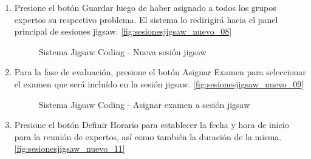 \begin{enumerate}
\begin{figure}
	\end{figure}
	\item Presione el botón Guardar luego de haber asignado a todos los grupos expertos su respectivo problema. El sistema lo redirigirá hacia el panel principal de sesiones jigsaw. \autoref{fig:sesionesjigsaw_nuevo_08}
	\begin{figure}
		\centering
		\caption{Sistema Jigsaw Coding - Nueva sesión jigsaw}
		\label{fig:sesionesjigsaw_nuevo_08}
	\end{figure}
	\item Para la fase de evaluación, presione el botón Asignar Examen para seleccionar el examen que será incluído en la sesión jigsaw. \autoref{fig:sesionesjigsaw_nuevo_09}
	\begin{figure}
		\centering
		\caption{Sistema Jigsaw Coding - Asignar examen a sesión jigsaw}
		\label{fig:sesionesjigsaw_nuevo_09}
	\end{figure}
	\item Presione el botón Definir Horario para establecer la fecha y hora de inicio para la reunión de expertos, así como también la duración de la misma. \autoref{fig:sesionesjigsaw_nuevo_11}

\end{enumerate}
